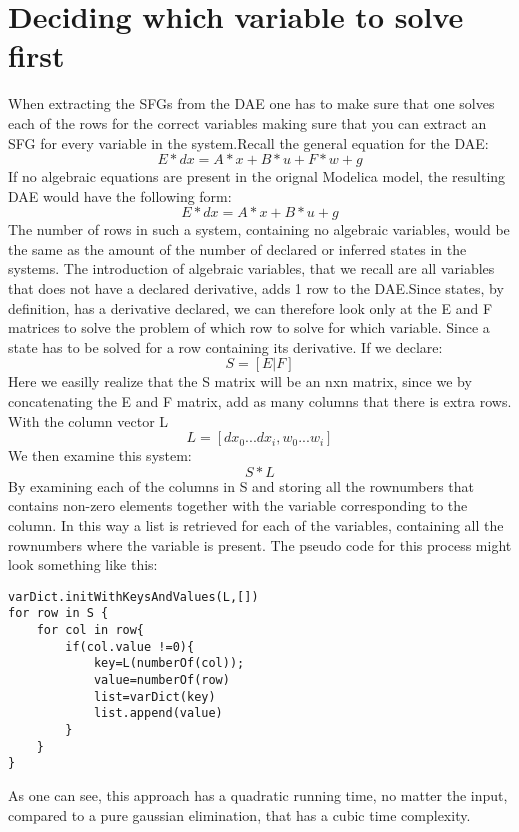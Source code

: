 
\section{Deciding which variable to solve first}
When extracting the SFGs from the DAE one has to make sure that one solves each of the rows for the correct variables making sure that you can extract an SFG for every variable in the system.Recall the general equation for the DAE:
\begin{equation}
E*dx = A*x + B*u + F*w + g
\end{equation}
If no algebraic equations are present in the orignal Modelica model, the resulting DAE would have the following form:
\begin{equation}
E*dx = A*x + B*u + g
\end{equation}
The number of rows in such a system, containing no algebraic variables, would be the same as the amount of the number of declared or inferred states in the systems. The introduction of algebraic variables, that we recall are all variables that does not have a declared derivative, adds 1 row to the DAE.Since states, by definition, has a derivative declared, we can therefore look only at the E and F matrices to solve the problem of which row to solve for which variable. Since a state has to be solved for a row containing its derivative. If we declare:
\begin{equation}
S=[E|F]
\end{equation}
Here we easilly realize that the S matrix will be an nxn matrix, since we by concatenating the E and F matrix, add as many columns that there is extra rows.\\
With the column vector L
\begin{equation}
L=[dx_0...dx_i, w_0...w_i]
\end{equation}
We then examine this system:
\begin{equation}
S*L
\end{equation}
By examining each of the columns in S and storing all the rownumbers that contains non-zero elements together with the variable corresponding to the column. In this way a list is retrieved for each of the variables, containing all the rownumbers where the variable is present.
The pseudo code for this process might look something like this:
\begin{lstlisting}
varDict.initWithKeysAndValues(L,[])
for row in S {
	for col in row{
		if(col.value !=0){
			key=L(numberOf(col));
			value=numberOf(row)
			list=varDict(key)
			list.append(value)		
		}
	}			
}
\end{lstlisting}
As one can see, this approach has a quadratic running time, no matter the input, compared to a pure gaussian elimination, that has a cubic time complexity.

